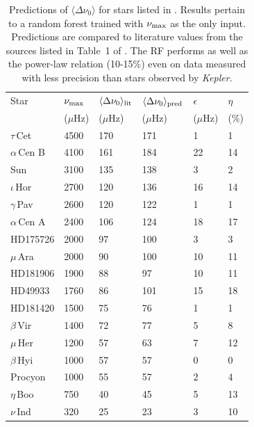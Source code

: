 \begin{table}
\centering
\caption{Predictions of $\langle\Delta\nu_0\rangle$ for stars listed in \citet{2009MNRAS.400L..80S}. Results pertain to a random forest trained with $\nu_{\rm{max}}$ as the only input. Predictions are compared to literature values from the sources listed in Table~1 of  \citet{2009MNRAS.400L..80S}. The RF performs as well as the power-law relation (10-15\%) even on data measured with less precision than stars observed by \emph{Kepler}.}
\label{tab:stello}
\begin{tabular}{llllll}
\hline  \hline
Star & $\nu_{\rm{max}}$ & $\langle\Delta\nu_0\rangle_{\rm{lit}}$ & $\langle\Delta\nu_0\rangle_{\rm{pred}}$ & $\epsilon$ & $\eta$  \\ 
& ($\mu$Hz) & ($\mu$Hz)  &($\mu$Hz) &($\mu$Hz) & (\%) \\ \hline
$\tau\,$Cet &4500 & 170 & 171 & 1  & 1  \\
$\alpha\,$Cen B &4100 & 161 & 184 & 22& 14  \\
Sun &3100 & 135 & 138 & 3 & 2    \\
$\iota\,$Hor &2700 & 120   & 136 &  16&14  \\
$\gamma\,$Pav  &2600 & 120 & 122 & 1  & 1  \\
$\alpha\,$Cen A &2400 & 106 & 124 & 18 & 17  \\
HD175726 &2000 & 97    & 100 & 3  & 3  \\
$\mu\,$Ara &2000 & 90    & 100 & 10 & 11  \\
HD181906 &1900 & 88  & 97  & 10 & 11 \\
HD49933 &1760 & 86  & 101 & 15 & 18  \\
HD181420 &1500 & 75    & 76  & 1  & 1  \\
$\beta\,$Vir &1400 & 72    & 77   & 5 & 8  \\
$\mu\,$Her  &1200 & 57  & 63   & 7 & 12  \\
$\beta\,$Hyi &1000 & 57  & 57  & 0  & 0  \\
Procyon &1000 & 55    & 57 & 2 & 4    \\
$\eta\,$Boo &750  & 40  & 45   & 5 & 13  \\
$\nu\,$Ind &320  & 25  & 23  & 3 & 10  \\ \hline
\end{tabular}
\end{table}

